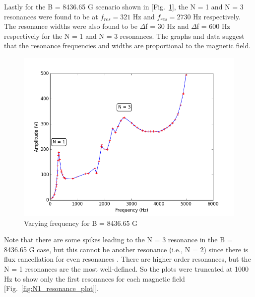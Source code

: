 \vspace*{-6mm}
Lastly for the B = 8436.65 G scenario shown in [Fig.~\ref{fig:freq_26A}], the N = 1 and N = 3 resonances were found to be at $f_{res} = 321$ Hz and $f_{res} = 2730$ Hz respectively. The resonance widths were also found to be $\Delta$f = 30 Hz and $\Delta$f = 600 Hz respectively for the N = 1 and N = 3 resonances. The graphs and data suggest that the resonance frequencies and widths are proportional to the magnetic field. 

\begin{figure}[H]
    \begin{center}
    \includegraphics[scale=0.46]{freq_26A_notitle.png}
    \caption{Varying frequency for B = 8436.65 G}
    \label{fig:freq_26A}
    \end{center}
\end{figure}

\vspace*{-10mm}
Note that there are some spikes leading to the N = 3 resonance in the B = 8436.65 G case, but this cannot be another resonance (i.e., N = 2) since there is flux cancellation for even resonances \cite{c1}. There are higher order resonances, but the N = 1 resonances are the most well-defined. So the plots were truncated at 1000 Hz to show only the first resonances for each magnetic field [Fig.~\ref{fig:N1_resonance_plot}]. 


